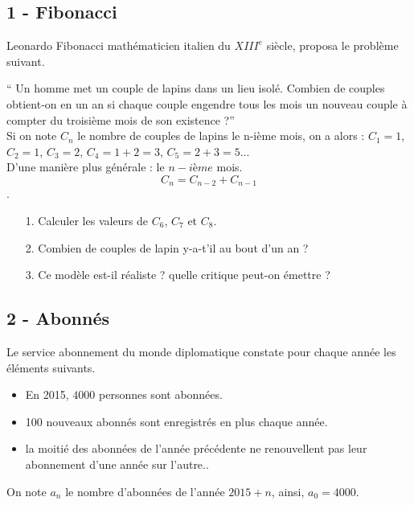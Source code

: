 \documentclass[12pt]{article}
\begin{document}

\setlength{\columnseprule}{1pt}

\begin{multicols}{2}
\subsection*{1 - Fibonacci}

Leonardo Fibonacci mathématicien italien du $XIII^e$ siècle, proposa le problème suivant.

`` Un homme met un couple de lapins dans un lieu isolé. Combien de couples obtient-on en un an si chaque couple engendre tous les mois un nouveau couple à compter du troisième mois de son existence ?''\\

Si on note $C_n$ le nombre de couples de lapins le n-ième mois, on a alors : $C_1 = 1$, $C_2 = 1$, $C_3 = 2$, $C_4 = 1 + 2 = 3$, $C_5 = 2 + 3 = 5$...\\
D'une manière plus générale : le $n-ième$ mois.
$$C_n = C_{n-2} + C_{n-1}$$.

\begin{enumerate}
\item[1.] Calculer les valeurs de $C_6$, $C_7$ et $C_8$.
\item[2.] Combien de couples de lapin y-a-t'il au bout d'un an ?
\item[3.] Ce modèle est-il réaliste ? quelle critique peut-on émettre ?
\end{enumerate}

\noindent\hrulefill

\subsection*{2 - Abonnés}

Le service abonnement du monde diplomatique constate pour chaque année les éléments suivants.

\begin{itemize}
\item En 2015, $4000$ personnes sont abonnées.
\item 100 nouveaux abonnés sont enregistrés en plus chaque année.
\item la moitié des abonnées de l’année précédente ne renouvellent pas leur abonnement d'une année sur l'autre..
\end{itemize}
On note $a_n$ le nombre d’abonnées de l’année $2015 + n$, ainsi, $a_0 = 4000$.


\end{multicols}
\end{document}
